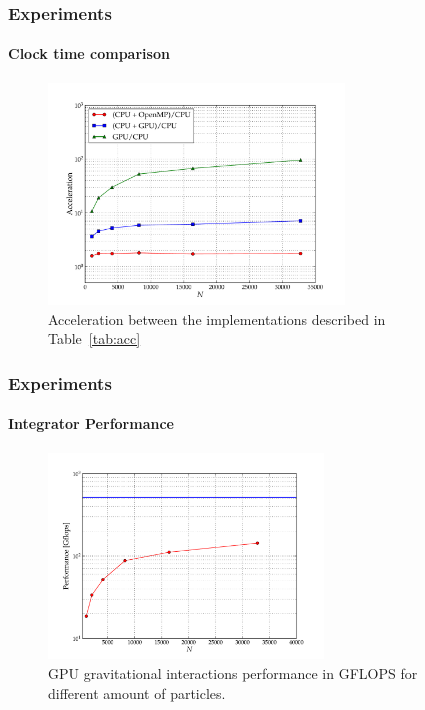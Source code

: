 \begin{frame}
    \frametitle{Experiments}
    \framesubtitle{Clock time comparison}

\begin{figure}[H]
    \centering
    \label{fig:acc}
    \includegraphics[width=0.7\textwidth]{img/test_gpu-acceleration.pdf}
    \caption{Acceleration between the implementations described in Table~\ref{tab:acc}}
\end{figure}

\end{frame}
\begin{frame}
    \frametitle{Experiments}
    \framesubtitle{Integrator Performance}
\begin{figure}[H]
    \centering
    \label{fig:gflops}
    \includegraphics[width=0.65\textwidth]{img/test_gflops.pdf}
    \caption{GPU gravitational interactions performance in GFLOPS for different amount of particles.}
\end{figure}

\end{frame}
